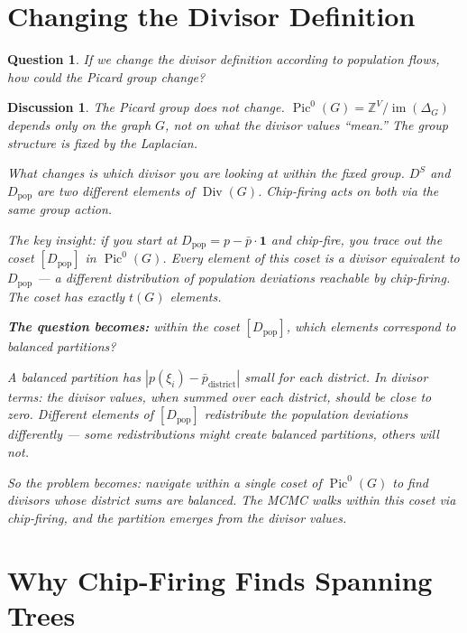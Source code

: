 \documentclass[11pt]{article}
\newcommand{\Z}{\mathbb{Z}}
\newcommand{\Pic}{\operatorname{Pic}^0}
\newtheorem{question}{Question}
\newtheorem{answer}{Discussion}
\begin{document}
\section{Changing the Divisor Definition}

\begin{question}
If we change the divisor definition according to population flows, how could
the Picard group change?
\end{question}

\begin{answer}
The Picard group does not change. $\Pic(G) = \Z^V / \operatorname{im}(\Delta_G)$
depends only on the graph $G$, not on what the divisor values ``mean.'' The
group structure is fixed by the Laplacian.

What changes is which divisor you are looking at within the fixed group. $D^S$
and $D_{\mathrm{pop}}$ are two different elements of $\operatorname{Div}(G)$.
Chip-firing acts on both via the same group action.

The key insight: if you start at $D_{\mathrm{pop}} = p - \bar{p} \cdot
\mathbf{1}$ and chip-fire, you trace out the coset $[D_{\mathrm{pop}}]$ in
$\Pic(G)$. Every element of this coset is a divisor equivalent to
$D_{\mathrm{pop}}$ --- a different distribution of population deviations
reachable by chip-firing. The coset has exactly $t(G)$ elements.

\textbf{The question becomes:} within the coset $[D_{\mathrm{pop}}]$, which
elements correspond to balanced partitions?

A balanced partition has $|p(\xi_i) - \bar{p}_{\mathrm{district}}|$ small for
each district. In divisor terms: the divisor values, when summed over each
district, should be close to zero. Different elements of $[D_{\mathrm{pop}}]$
redistribute the population deviations differently --- some redistributions
might create balanced partitions, others will not.

So the problem becomes: navigate within a single coset of $\Pic(G)$ to find
divisors whose district sums are balanced. The MCMC walks within this coset
via chip-firing, and the partition emerges from the divisor values.
\end{answer}


\section{Why Chip-Firing Finds Spanning Trees}
\end{document}
